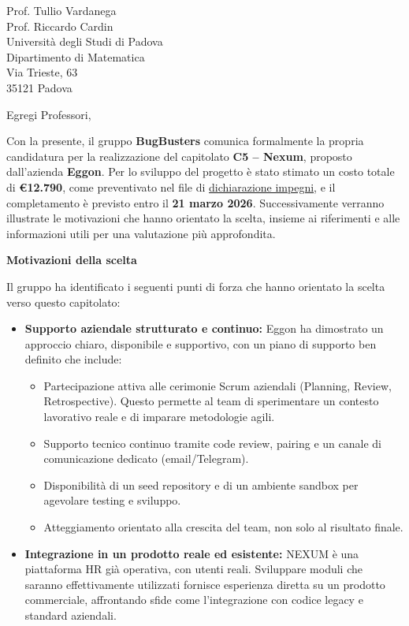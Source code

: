 \documentclass[a4paper,11pt]{letter}
\begin{document}
\begin{letter}{Prof. Tullio Vardanega\\Prof. Riccardo Cardin\\Universit\`a degli Studi di Padova\\Dipartimento di Matematica\\Via Trieste, 63\\35121 Padova}
\vspace{1.5em}

\opening{Egregi Professori,}

Con la presente, il gruppo \textbf{BugBusters} comunica formalmente la propria candidatura per la realizzazione
 del capitolato \textbf{C5 -- Nexum}, proposto dall'azienda \textbf{Eggon}. 
 Per lo sviluppo del progetto è stato stimato un costo totale di \textbf{€12.790}, come preventivato nel file di 
 \href{https://bugbustersunipd.github.io/BugBusterSite/assets/docs/DICHIARAZIONE_IMPEGNI/Dichiarazione_impegni.pdf}{dichiarazione impegni},
  e il completamento è previsto entro il \textbf{21 marzo 2026}. Successivamente verranno illustrate le motivazioni che hanno 
 orientato la scelta, insieme ai riferimenti e alle informazioni utili per una valutazione 
 più approfondita.

\vspace{0.8em}

	\textbf{Motivazioni della scelta}


Il gruppo ha identificato i seguenti punti di forza che hanno orientato la scelta verso questo capitolato:

\begin{itemize}
    \item \textbf{Supporto aziendale strutturato e continuo:} Eggon ha dimostrato un approccio chiaro, disponibile e supportivo, con un piano di supporto ben definito che include:
    \begin{itemize}
        \item Partecipazione attiva alle cerimonie Scrum aziendali (Planning, Review, Retrospective). Questo permette al team di sperimentare un contesto lavorativo reale e di imparare metodologie agili.
        \item Supporto tecnico continuo tramite code review, pairing e un canale di comunicazione dedicato (email/Telegram).
        \item Disponibilità di un seed repository e di un ambiente sandbox per agevolare testing e sviluppo.
        \item Atteggiamento orientato alla crescita del team, non solo al risultato finale.
    \end{itemize}

    \item \textbf{Integrazione in un prodotto reale ed esistente:} NEXUM è una piattaforma HR già operativa, con utenti reali. Sviluppare moduli che saranno effettivamente utilizzati fornisce esperienza diretta su un prodotto commerciale, affrontando sfide come l'integrazione con codice legacy e standard aziendali.


\end{itemize}
\end{letter}
\end{document}
